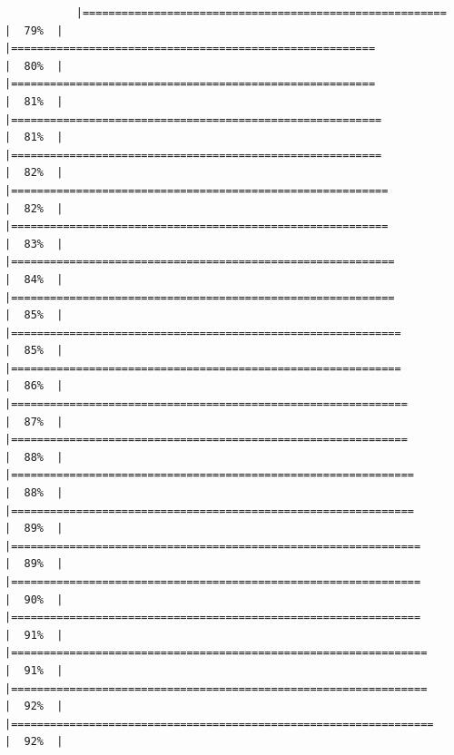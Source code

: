\documentclass[
]{article}
\begin{document}
\begin{verbatim}
           |========================================================              |  79%  |                                                                              |========================================================              |  80%  |                                                                              |========================================================              |  81%  |                                                                              |=========================================================             |  81%  |                                                                              |=========================================================             |  82%  |                                                                              |==========================================================            |  82%  |                                                                              |==========================================================            |  83%  |                                                                              |===========================================================           |  84%  |                                                                              |===========================================================           |  85%  |                                                                              |============================================================          |  85%  |                                                                              |============================================================          |  86%  |                                                                              |=============================================================         |  87%  |                                                                              |=============================================================         |  88%  |                                                                              |==============================================================        |  88%  |                                                                              |==============================================================        |  89%  |                                                                              |===============================================================       |  89%  |                                                                              |===============================================================       |  90%  |                                                                              |===============================================================       |  91%  |                                                                              |================================================================      |  91%  |                                                                              |================================================================      |  92%  |                                                                              |=================================================================     |  92%  |                                                                    
\end{verbatim}
\end{document}
